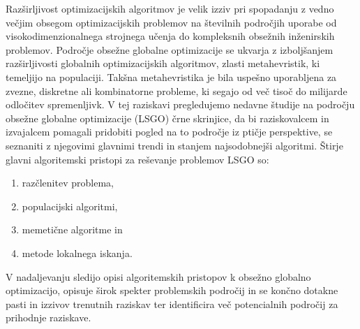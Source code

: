 Razširljivost optimizacijskih algoritmov je velik izziv pri spopadanju z vedno večjim obsegom optimizacijskih problemov na številnih področjih uporabe od visokodimenzionalnega strojnega učenja do kompleksnih obsežnih inženirskih problemov.
Področje obsežne globalne optimizacije se ukvarja z izboljšanjem razširljivosti globalnih optimizacijskih algoritmov, zlasti metahevristik, ki temeljijo na populaciji.
Takšna metahevristika je bila uspešno uporabljena za zvezne, diskretne ali kombinatorne probleme, ki segajo od več tisoč do milijarde odločitev spremenljivk.
V tej raziskavi pregledujemo nedavne študije na področju obsežne globalne optimizacije (LSGO) črne skrinjice, da bi raziskovalcem in izvajalcem pomagali pridobiti pogled na to področje iz ptičje perspektive, se seznaniti z njegovimi glavnimi trendi in stanjem najsodobnejši algoritmi.
Štirje glavni algoritemski pristopi za reševanje problemov LSGO so:
\begin{enumerate}
	\item razčlenitev problema,
	\item populacijski algoritmi,
	\item memetične algoritme in
	\item metode lokalnega iskanja.
\end{enumerate}
V nadaljevanju sledijo opisi algoritemskih pristopov k obsežno globalno optimizacijo, opisuje širok spekter problemskih področij in se končno dotakne pasti in izzivov trenutnih raziskav ter identificira več potencialnih področij za prihodnje raziskave.


